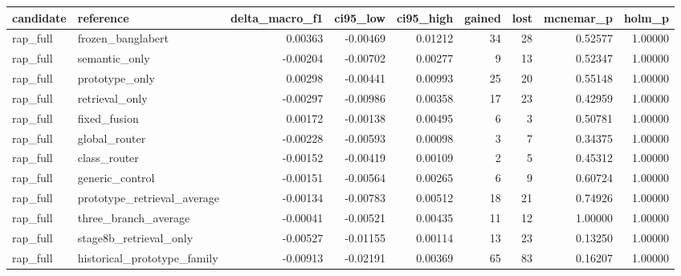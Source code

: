 \begin{tabular}{llrrrrrrr}
\toprule
candidate & reference & delta_macro_f1 & ci95_low & ci95_high & gained & lost & mcnemar_p & holm_p \\
\midrule
rap_full & frozen_banglabert & 0.00363 & -0.00469 & 0.01212 & 34 & 28 & 0.52577 & 1.00000 \\
rap_full & semantic_only & -0.00204 & -0.00702 & 0.00277 & 9 & 13 & 0.52347 & 1.00000 \\
rap_full & prototype_only & 0.00298 & -0.00441 & 0.00993 & 25 & 20 & 0.55148 & 1.00000 \\
rap_full & retrieval_only & -0.00297 & -0.00986 & 0.00358 & 17 & 23 & 0.42959 & 1.00000 \\
rap_full & fixed_fusion & 0.00172 & -0.00138 & 0.00495 & 6 & 3 & 0.50781 & 1.00000 \\
rap_full & global_router & -0.00228 & -0.00593 & 0.00098 & 3 & 7 & 0.34375 & 1.00000 \\
rap_full & class_router & -0.00152 & -0.00419 & 0.00109 & 2 & 5 & 0.45312 & 1.00000 \\
rap_full & generic_control & -0.00151 & -0.00564 & 0.00265 & 6 & 9 & 0.60724 & 1.00000 \\
rap_full & prototype_retrieval_average & -0.00134 & -0.00783 & 0.00512 & 18 & 21 & 0.74926 & 1.00000 \\
rap_full & three_branch_average & -0.00041 & -0.00521 & 0.00435 & 11 & 12 & 1.00000 & 1.00000 \\
rap_full & stage8b_retrieval_only & -0.00527 & -0.01155 & 0.00114 & 13 & 23 & 0.13250 & 1.00000 \\
rap_full & historical_prototype_family & -0.00913 & -0.02191 & 0.00369 & 65 & 83 & 0.16207 & 1.00000 \\
\bottomrule
\end{tabular}
